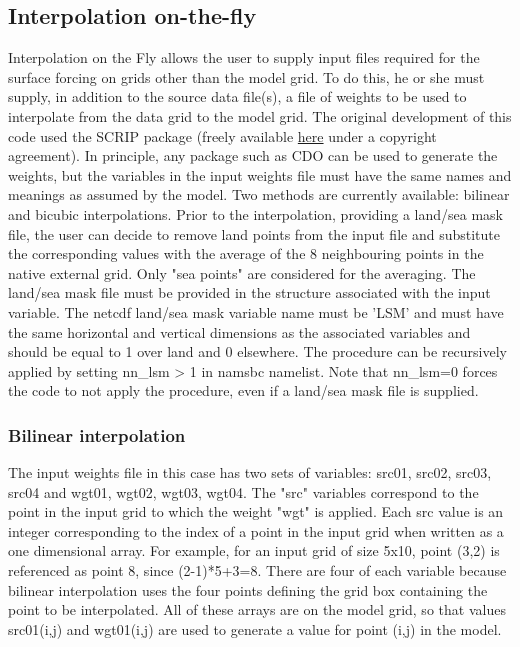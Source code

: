 \documentclass[../main/NEMO_manual]{subfiles}
\begin{document}
\subsection{Interpolation on-the-fly}
\label{subsec:SBC_iof}

Interpolation on the Fly allows the user to supply input files required for the surface forcing on
grids other than the model grid.
To do this, he or she must supply, in addition to the source data file(s), a file of weights to be used to
interpolate from the data grid to the model grid.
The original development of this code used the SCRIP package
(freely available \href{http://climate.lanl.gov/Software/SCRIP}{here} under a copyright agreement).
In principle, any package such as CDO can be used to generate the weights, but the variables in
the input weights file must have the same names and meanings as assumed by the model.
Two methods are currently available: bilinear and bicubic interpolations.
Prior to the interpolation, providing a land/sea mask file, the user can decide to remove land points from
the input file and substitute the corresponding values with the average of the 8 neighbouring points in
the native external grid.
Only "sea points" are considered for the averaging.
The land/sea mask file must be provided in the structure associated with the input variable.
The netcdf land/sea mask variable name must be 'LSM' and must have the same horizontal and vertical dimensions as
the associated variables and should be equal to 1 over land and 0 elsewhere.
The procedure can be recursively applied by setting nn\_lsm > 1 in namsbc namelist.
Note that nn\_lsm=0 forces the code to not apply the procedure, even if a land/sea mask file is supplied.

\subsubsection{Bilinear interpolation}
\label{subsec:SBC_iof_bilinear}

The input weights file in this case has two sets of variables:
src01, src02, src03, src04 and wgt01, wgt02, wgt03, wgt04.
The "src" variables correspond to the point in the input grid to which the weight "wgt" is applied.
Each src value is an integer corresponding to the index of a point in the input grid when
written as a one dimensional array.
For example, for an input grid of size 5x10, point (3,2) is referenced as point 8, since (2-1)*5+3=8.
There are four of each variable because bilinear interpolation uses the four points defining
the grid box containing the point to be interpolated.
All of these arrays are on the model grid, so that values src01(i,j) and wgt01(i,j) are used to
generate a value for point (i,j) in the model.
\end{document}
